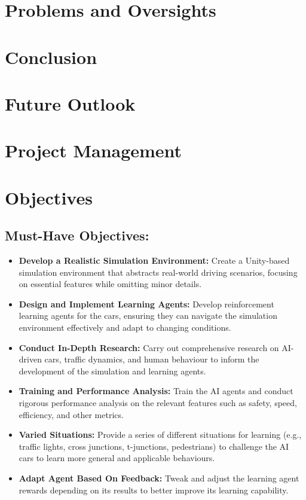 \documentclass{article}
\begin{document}
\section{Problems and Oversights}
\lipsum[2][1]

\section{Conclusion}
\lipsum[2][1]

\section{Future Outlook}
\lipsum[2][1]

\section{Project Management}
\lipsum[2][1]

\section{Objectives}
\subsection{Must-Have Objectives:}
\begin{itemize}
\item \textbf{Develop a Realistic Simulation Environment:} Create a Unity-based simulation environment that abstracts real-world driving scenarios, focusing on essential features while omitting minor details.

\item \textbf{Design and Implement Learning Agents:} Develop reinforcement learning agents for the cars, ensuring they can navigate the simulation environment effectively and adapt to changing conditions.

\item \textbf{Conduct In-Depth Research:} Carry out comprehensive research on AI-driven cars, traffic dynamics, and human behaviour to inform the development of the simulation and learning agents.

\item \textbf{Training and Performance Analysis:} Train the AI agents and conduct rigorous performance analysis on the relevant features such as safety, speed, efficiency, and other metrics.

\item \textbf{Varied Situations:} Provide a series of different situations for learning (e.g., traffic lights, cross junctions, t-junctions, pedestrians) to challenge the AI cars to learn more general and applicable behaviours.

\item \textbf{Adapt Agent Based On Feedback:} Tweak and adjust the learning agent rewards depending on its results to better improve its learning capability.

\end{itemize}
\end{document}
